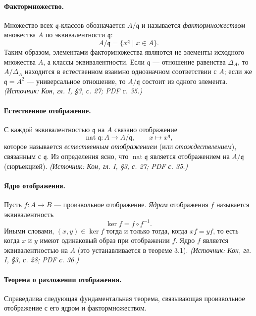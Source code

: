 \documentclass[a4paper,12pt]{article}
\begin{document}
\paragraph{Фактормножество.}
Множество всех \(\mathfrak{q}\)-классов обозначается \(A/\mathfrak{q}\) и называется \emph{фактормножеством} множества \(A\) по эквивалентности \(\mathfrak{q}\):
\[
A/\mathfrak{q}=\{x^{\mathfrak{q}}\mid x\in A\}.
\]
Таким образом, элементами фактормножества являются не элементы исходного множества \(A\), а классы эквивалентности. Если \(\mathfrak{q}\) — отношение равенства \(\Delta_A\), то \(A/\Delta_A\) находится в естественном взаимно однозначном соответствии с \(A\); если же \(\mathfrak{q}=A^2\) — универсальное отношение, то \(A/\mathfrak{q}\) состоит из одного элемента.
\textit{(Источник: Кон, гл. I, §3, с. 27; PDF с. 35.)}

\paragraph{Естественное отображение.}
С каждой эквивалентностью \(\mathfrak{q}\) на \(A\) связано отображение
\[
\operatorname{nat}\mathfrak{q}\colon A\to A/\mathfrak{q},\qquad
x\mapsto x^{\mathfrak{q}},
\]
которое называется \emph{естественным отображением} (или \emph{отождествлением}), связанным с \(\mathfrak{q}\). Из определения ясно, что \(\operatorname{nat}\mathfrak{q}\) является отображением на \(A/\mathfrak{q}\) (сюръекцией).
\textit{(Источник: Кон, гл. I, §3, с. 27; PDF с. 35.)}

\paragraph{Ядро отображения.}
Пусть \(f\colon A\to B\) — произвольное отображение. \emph{Ядром} отображения \(f\) называется эквивалентность
\[
\ker f=f\circ f^{-1}.
\]
Иными словами, \((x,y)\in\ker f\) тогда и только тогда, когда \(xf=yf\), то есть когда \(x\) и \(y\) имеют одинаковый образ при отображении \(f\). Ядро \(f\) является эквивалентностью на \(A\) (это устанавливается в теореме 3.1).
\textit{(Источник: Кон, гл. I, §3, с. 28; PDF с. 36.)}

\paragraph{Теорема о разложении отображения.}
Справедлива следующая фундаментальная теорема, связывающая произвольное отображение с его ядром и фактормножеством.
\end{document}
